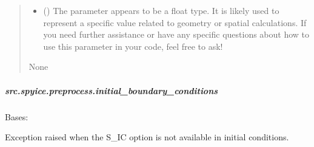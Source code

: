 \documentclass[a4paper,11pt,english,openany]{sphinxmanual}
\begin{document}
\begin{fulllineitems}
\begin{fulllineitems}
\begin{quote}
\begin{description}
\begin{itemize}
\item {} 
\sphinxAtStartPar
{} () \textendash{} The parameter  appears to be a float type. It is likely used to represent a specific value related to geometry or spatial calculations. If you need further assistance or have any specific questions about how to use this parameter in your code, feel free to ask!

\end{itemize}

\sphinxAtStartPar
None

\end{description}\end{quote}

\end{fulllineitems}


\end{fulllineitems}


\sphinxstepscope


\subparagraph{src.spyice.preprocess.initial\_boundary\_conditions}
\label{\detokenize{api/spyice.preprocess.initial_boundary_conditions:module-src.spyice.preprocess.initial_boundary_conditions}}\label{\detokenize{api/spyice.preprocess.initial_boundary_conditions:src-spyice-preprocess-initial-boundary-conditions}}\label{\detokenize{api/spyice.preprocess.initial_boundary_conditions::doc}}

\begin{fulllineitems}
\label{\detokenize{api/spyice.preprocess.initial_boundary_conditions:src.spyice.preprocess.initial_boundary_conditions.SalinityUnavailableError}}
\pysigstartsignatures
\pysigline
{}
\pysigstopsignatures
\sphinxAtStartPar
Bases: 

\sphinxAtStartPar
Exception raised when the S\_IC option is not available in initial conditions.

\end{fulllineitems}
\end{document}
